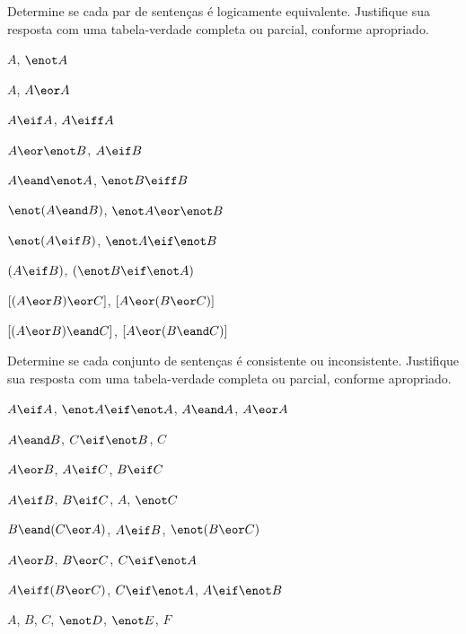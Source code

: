 \solutions
\problempart
\label{pr.TT.equiv}
Determine se cada par de sentenças é logicamente equivalente. Justifique sua resposta com uma tabela-verdade completa ou parcial, conforme apropriado.
\begin{earg}
\item $A$, $\enot A$ %
\item $A$, $A \eor A$ %
\item $A\eif A$, $A \eiff A$ %
\item $A \eor \enot B$, $A\eif B$ %
\item $A \eand \enot A$, $\enot B \eiff B$ %
\item $\enot(A \eand B)$, $\enot A \eor \enot B$ %
\item $\enot(A \eif B)$, $\enot A \eif \enot B$ %
\item $(A \eif B)$, $(\enot B \eif \enot A)$ %
\item $[(A \eor B) \eor C]$, $[A \eor (B \eor C)]$ %
\item $[(A \eor B) \eand C]$, $[A \eor (B \eand C)]$ %
\end{earg}

\solutions
\problempart
\label{pr.TT.consistent}
Determine se cada conjunto de sentenças é consistente ou inconsistente. Justifique sua resposta com uma tabela-verdade completa ou parcial, conforme apropriado.
\begin{earg}
\item $A\eif A$, $\enot A \eif \enot A$, $A\eand A$, $A\eor A$ %
\item $A \eand B$, $C\eif \enot B$, $C$ %
\item $A\eor B$, $A\eif C$, $B\eif C$ %
\item $A\eif B$, $B\eif C$, $A$, $\enot C$ %
\item $B\eand(C\eor A)$, $A\eif B$, $\enot(B\eor C)$  %
\item $A \eor B$, $B\eor C$, $C\eif \enot A$ %
\item $A\eiff(B\eor C)$, $C\eif \enot A$, $A\eif \enot B$ %
\item $A$, $B$, $C$, $\enot D$, $\enot E$, $F$ %
\end{earg}

